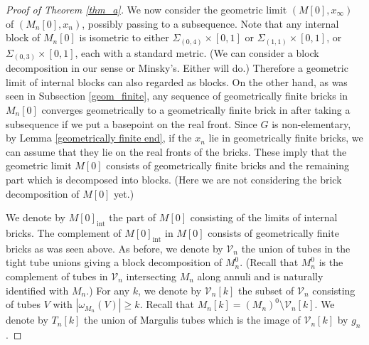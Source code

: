 \documentclass{amsart}
\theoremstyle{definition}
\numberwithin{figure}{section}
\numberwithin{equation}{section}
\def\cv{\mathcal{V}}
\def\Sg{\Sigma}
\def\Sg{\Sigma}
\begin{document}
\begin{proof}[Proof of Theorem \ref{thm_a}]
We now consider the geometric limit $(M[0], x_\infty)$ of $(M_n[0], x_n)$, possibly passing to a subsequence.
Note that any internal block of  $M_n[0]$ is isometric to either $\Sg_{(0,4)}\times [0,1]$ or 
$\Sg_{(1,1)}\times [0,1]$, or $\Sg_{(0,3)}\times [0,1]$, each with a standard metric.
(We can consider a block decomposition in our sense or Minsky's. Either will do.)
Therefore a geometric limit of internal blocks can also regarded as blocks.
On the other hand, as was seen in Subsection \ref{geom_finite}, any sequence of geometrically finite bricks in $M_n[0]$ converges geometrically to a geometrically finite brick in after taking a subsequence if we put a basepoint on the real front.
Since $G$ is non-elementary, by Lemma \ref{geometrically finite end}, if the $x_n$ lie in geometrically finite bricks, we can assume that they lie on the real fronts of the bricks.
These imply  that the geometric limit $M[0]$  consists of geometrically finite bricks and the remaining part which is decomposed into blocks.
(Here we are not considering the brick decomposition of $M[0]$ yet.)

We denote by $M[0]_\mathrm{int}$ the part of $M[0]$ consisting of the limits of internal bricks.
The complement of $M[0]_\mathrm{int}$ in $M[0]$ consists of geometrically finite bricks as was seen above.
As before, we denote by $\cv_n$ the union of tubes in the tight tube unions giving a block decomposition of $M_n^0$.
(Recall that $M_n^0$ is the complement of tubes in $\cv_n$ intersecting $M_n$ along annuli and is naturally identified with $M_n$.)
For any $k$, we denote by $\cv_n[k]$ the subset of $\cv_n$ consisting of tubes $V$ with $|\omega_{M_n}(V)| \geq k$.
Recall that $M_n[k]=(M_n)^0 \setminus \cv_n[k]$.
We denote by $T_n[k]$ the union of Margulis tubes which is  the image of $\cv_n[k]$ by $g_n$. 


\end{proof}
\end{document}
